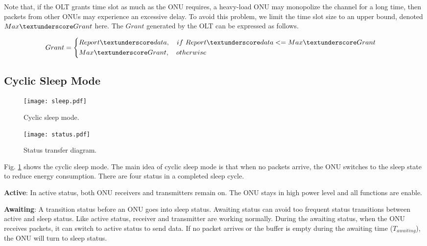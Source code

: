 \documentclass[journal]{IEEEtran}
\begin{document}
Note that, if the OLT grants time slot as much as the ONU requires, a heavy-load ONU may monopolize the channel for a long time, then packets from other ONUs may experience an excessive delay. To avoid this problem, we limit the time slot size to an upper bound, denoted $Max\textunderscore Grant$ here. The $Grant$ generated by the OLT can be expressed as follows.

\begin{footnotesize}
\begin{equation}
Grant  =  
\left\{
\begin{aligned}
& Report\textunderscore data, \quad if \ Report\textunderscore data <= Max\textunderscore Grant & \\
& Max\textunderscore Grant, \quad otherwise & \\
\end{aligned}
\right.
\end{equation}
\end{footnotesize}

\subsection{Cyclic Sleep Mode}

\begin{figure}[t]
    \centering 
        \texttt{[image: sleep.pdf]}\\ 
    \caption{ Cyclic sleep mode.}
    \label{sleep}
\end{figure}

\begin{figure}[t]
    \centering 
        \texttt{[image: status.pdf]}\\ 
    \caption{ Status transfer diagram.}
    \label{status}
\end{figure}

Fig. \ref{sleep} shows the cyclic sleep mode. The main idea of cyclic sleep mode is that when no packets arrive, the ONU switches to the sleep state to reduce energy consumption. There are four status in a completed sleep cycle.

\textbf{Active}: In active status, both ONU receivers and transmitters remain on. The ONU stays in high power level and all functions are enable.

\textbf{Awaiting}: A transition status before an ONU goes into sleep status. Awaiting status can avoid too frequent status transitions between active and sleep status. Like active status, receiver and transmitter are working normally. During the awaiting status, when the ONU receives packets, it can switch to active status to send data. If no packet arrives or the buffer is empty during the awaiting time ($T_{awaiting}$), the ONU will turn to sleep status.
\end{document}
